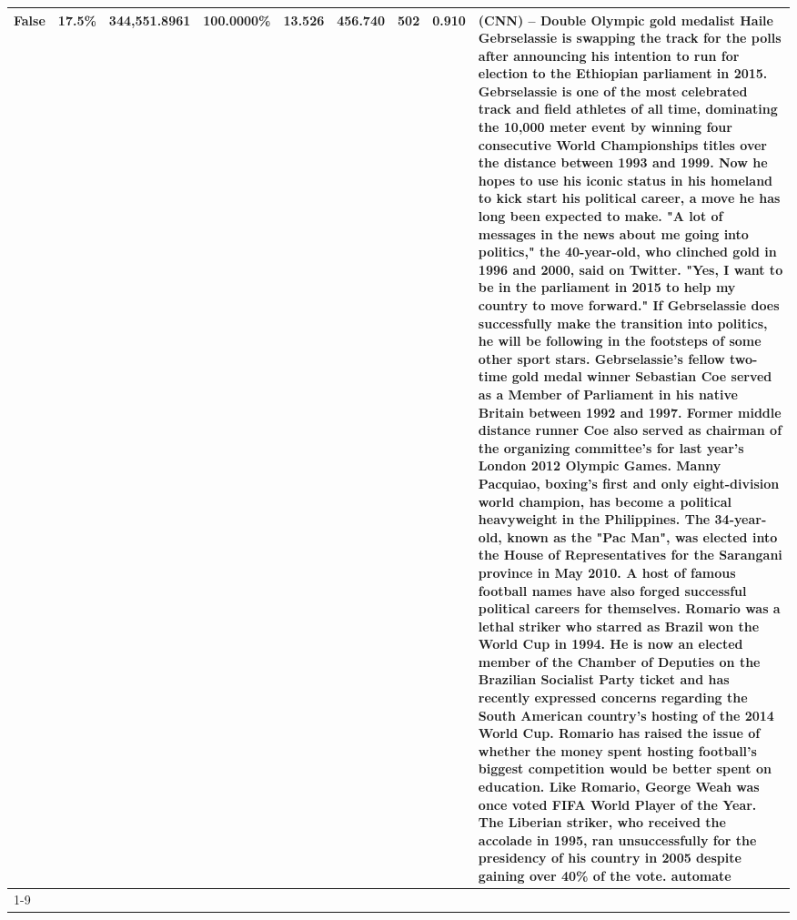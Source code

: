 \begin{table}[H]
{\begin{tabular}{lllrlllll}
False & 17.5\% & 344,551.8961 & \bfseries \color{red} 100.0000\% & 13.526 & 456.740 & 502 & 0.910 & (CNN) -- Double Olympic gold medalist Haile Gebrselassie is swapping the track for the polls after announcing his intention to run for election to the Ethiopian parliament in 2015. Gebrselassie is one of the most celebrated track and field athletes of all time, dominating the 10,000 meter event by winning four consecutive World Championships titles over the distance between 1993 and 1999. Now he hopes to use his iconic status in his homeland to kick start his political career, a move he has long been expected to make. "A lot of messages in the news about me going into politics," the 40-year-old, who clinched gold in 1996 and 2000, said on Twitter. "Yes, I want to be in the parliament in 2015 to help my country to move forward." If Gebrselassie does successfully make the transition into politics, he will be following in the footsteps of some other sport stars. Gebrselassie's fellow two-time gold medal winner Sebastian Coe served as a Member of Parliament in his native Britain between 1992 and 1997. Former middle distance runner Coe also served as chairman of the organizing committee's for last year's London 2012 Olympic Games. Manny Pacquiao, boxing's first and only eight-division world champion, has become a political heavyweight in the Philippines. The 34-year-old, known as the "Pac Man", was elected into the House of Representatives for the Sarangani province in May 2010. A host of famous football names have also forged successful political careers for themselves. Romario was a lethal striker who starred as Brazil won the World Cup in 1994. He is now an elected member of the Chamber of Deputies on the Brazilian Socialist Party ticket and has recently expressed concerns regarding the South American country's hosting of the 2014 World Cup. Romario has raised the issue of whether the money spent hosting football's biggest competition would be better spent on education. Like Romario, George Weah was once voted FIFA World Player of the Year. The Liberian striker, who received the accolade in 1995, ran unsuccessfully for the presidency of his country in 2005 despite gaining over 40\% of the vote. automate \\
\cline{1-9}

\end{tabular}}
\end{table}
